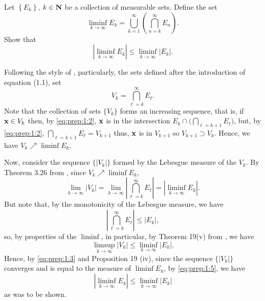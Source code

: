 \begin{problem}
  Let $\left\{ E_k \right\}$, $k\in\mathbf{N}$ be a collection of measurable
  sets. Define the set
  \[
    \liminf_{k\to\infty} E_k
    =\bigcup_{k=1}^\infty\left(\bigcap_{n=k}^\infty E_n\right).
  \]
  Show that
  \[
    \left|\liminf_{k\to\infty}
      E_k\right|\leq\liminf_{k\to\infty}\left|E_k\right|.
  \]
\end{problem}
\begin{solution}
  Following the style of \cite[Ch.\@ 1, p.\@ 2]{wheeden-zygmund},
  particularly, the sets defined after the introduction of equation (1.1),
  set
  \begin{equation}
    \label{eq:prep:1:2}
    V_k=\bigcap_{\ell=k}^\infty E_\ell.
  \end{equation}
  Note that the collection of sets $\{V_k\}$ forms an increasing sequence,
  that is, if $\mathbf{x}\in V_k$ then, by \eqref{eq:prep:1:2}, $\mathbf{x}$ is in the
  intersection $E_k\cap\bigl(\bigcap_{\ell=k+1}E_\ell\bigr)$, but, by
  \eqref{eq:prep:1:2}, $\bigcap_{\ell=k+1}E_\ell=V_{k+1}$ thus, $\mathbf{x}$ is
  in $V_{k+1}$ so $V_{k+1}\supset V_k$. Hence, we have
  $V_k\nearrow\liminf E_k$.

  Now, consider the sequence $\{|V_k|\}$ formed by the Lebesgue measure of
  the $V_k$. By Theorem 3.26 from \cite[Ch.\@ 3, p.\@ 51]{wheeden-zygmund},
  since $V_k\nearrow\liminf E_k$,
  \begin{equation}
    \label{eq:prep:1:3}
    \lim_{k\to\infty}|V_k|=
    \lim_{k\to\infty}\left|\bigcap_{\ell=k}^\infty E_\ell\right|=
    \left|\liminf_{k\to\infty} E_k\right|.
  \end{equation}
  But note that, by the monotonicity of the Lebesgue measure, we have
  \begin{equation}
    \label{eq:prep:1:4}
    \left|\bigcap_{\ell=k}^\infty E_\ell\right|\leq |E_k|,
  \end{equation}
  so, by properties of the $\liminf$, in particular, by Theorem 19(v) from
  \cite[Ch.\@ 1, p.\@ 23]{royden}, we have
  \begin{equation}
    \label{eq:prep:1:5}
    \limsup_{k\to\infty}|V_k|\leq\liminf_{k\to\infty}|E_k|.
  \end{equation}
  Hence, by \eqref{eq:prep:1:3} and Proposition 19 (iv), since the sequence
  $\{|V_k|\}$ converges and is equal to the measure of $\liminf E_k$, by
  \eqref{eq:prep:1:5}, we have
  \begin{equation}
    \label{eq:prep:1:6}
    \left|\liminf_{k\to\infty} E_k\right|\leq\liminf_{k\to\infty}|E_k|
  \end{equation}
  as was to be shown.
\end{solution}

